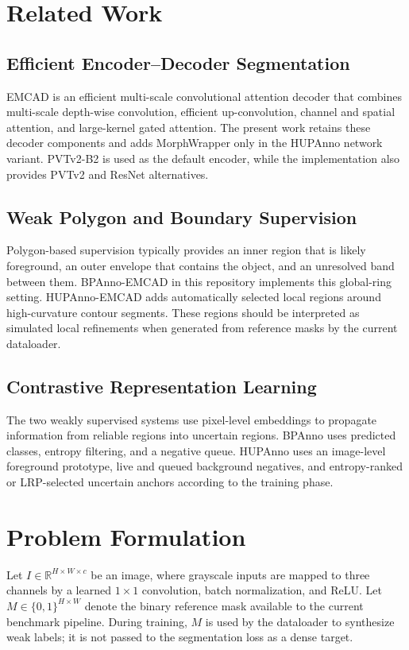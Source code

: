 \documentclass[journal]{IEEEtran}
\newcommand{\R}{\mathbb{R}}
\begin{document}
\section{Related Work}
\subsection{Efficient Encoder--Decoder Segmentation}
EMCAD is an efficient multi-scale convolutional attention decoder that combines multi-scale depth-wise convolution, efficient up-convolution, channel and spatial attention, and large-kernel gated attention. The present work retains these decoder components and adds MorphWrapper only in the HUPAnno network variant. PVTv2-B2 is used as the default encoder, while the implementation also provides PVTv2 and ResNet alternatives.

\subsection{Weak Polygon and Boundary Supervision}
Polygon-based supervision typically provides an inner region that is likely foreground, an outer envelope that contains the object, and an unresolved band between them. BPAnno-EMCAD in this repository implements this global-ring setting. HUPAnno-EMCAD adds automatically selected local regions around high-curvature contour segments. These regions should be interpreted as simulated local refinements when generated from reference masks by the current dataloader.

\subsection{Contrastive Representation Learning}
The two weakly supervised systems use pixel-level embeddings to propagate information from reliable regions into uncertain regions. BPAnno uses predicted classes, entropy filtering, and a negative queue. HUPAnno uses an image-level foreground prototype, live and queued background negatives, and entropy-ranked or LRP-selected uncertain anchors according to the training phase.

\section{Problem Formulation}
Let $I\in\R^{H\times W\times c}$ be an image, where grayscale inputs are mapped to three channels by a learned $1\times1$ convolution, batch normalization, and ReLU. Let $M\in\{0,1\}^{H\times W}$ denote the binary reference mask available to the current benchmark pipeline. During training, $M$ is used by the dataloader to synthesize weak labels; it is not passed to the segmentation loss as a dense target.
\end{document}
